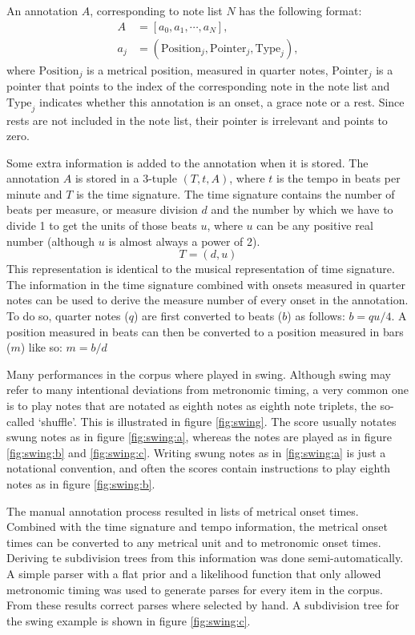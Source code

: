 An annotation $A$, corresponding to note list $N$ has the following format:
\begin{align*}
A &= [a_0, a_1, \cdots, a_N],\\
a_j &= (\mathrm{Position}_j, \mathrm{Pointer}_j, \mathrm{Type}_j),
\end{align*}
where $\mathrm{Position}_j$ is a metrical position, measured in quarter notes, $\mathrm{Pointer}_j$ is a pointer that points to the index of the corresponding note in the note list and $\mathrm{Type}_j$ indicates whether this annotation is an onset, a grace note or a rest. Since rests are not included in the note list, their pointer is irrelevant and points to zero. 

Some extra information is added to the annotation when it is stored. The annotation $A$ is stored in a 3-tuple $(T, t, A)$, where $t$ is the tempo in beats per minute and $T$ is the time signature. The time signature contains the number of beats per measure, or measure division $d$ and the number by which we have to divide 1 to get the units of those beats $u$, where $u$ can be any positive real number (although $u$ is almost always a power of 2). 
\begin{equation*}
T = (d, u)
\end{equation*}
This representation is identical to the musical representation of time signature. The information in the time signature combined with onsets measured in quarter notes can be used to derive the measure number of every onset in the annotation. To do so, quarter notes ($q$) are first converted to beats ($b$) as follows: $b = qu/4$. A position measured in beats can then be converted to a position measured in bars ($m$) like so: $m = b/d$

Many performances in the corpus where played in swing. Although swing may refer to many intentional deviations from metronomic timing, a very common one is to play notes that are notated as eighth notes as eighth note triplets, the so-called `shuffle'. This is illustrated in figure \ref{fig:swing}. The score usually notates swung notes as in figure \ref{fig:swing:a}, whereas the notes are played as in figure \ref{fig:swing:b} and \ref{fig:swing:c}. Writing swung notes as in \ref{fig:swing:a} is just a notational convention, and often the scores contain instructions to play eighth notes as in figure \ref{fig:swing:b}.

The manual annotation process resulted in lists of metrical onset times. Combined with the time signature and tempo information, the metrical onset times can be converted to any metrical unit and to metronomic onset times. Deriving te subdivision trees from this information was done semi-automatically. A simple parser with a flat prior and a likelihood function that only allowed metronomic timing was used to generate parses for every item in the corpus. From these results correct parses where selected by hand. A subdivision tree for the swing example is shown in figure \ref{fig:swing:c}. 


